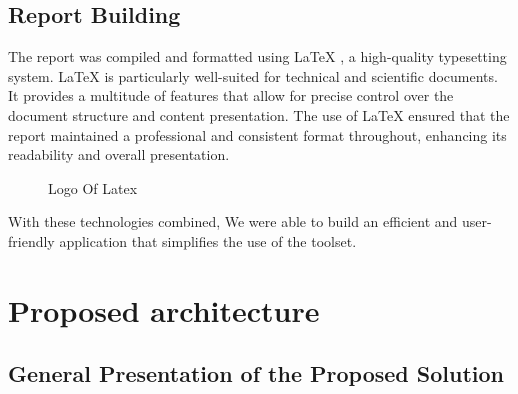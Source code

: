 \subsection{Report Building}
The report was compiled and formatted using {\color{purple}LaTeX} \cite{latex}, a high-quality typesetting system. LaTeX is particularly well-suited for technical and scientific documents. It provides a multitude of features that allow for precise control over the document structure and content presentation. The use of LaTeX ensured that the report maintained a professional and consistent format throughout, enhancing its readability and overall presentation.
\begin{figure}[H]
    \centering
    \caption{  Logo Of Latex }
    \label{fig: Latex_Logo}
\end{figure}

With these technologies combined, We were able to build an efficient and user-friendly application that simplifies the use of the  toolset.

\newpage
\section{Proposed architecture}
\subsection{General Presentation of the Proposed Solution}



